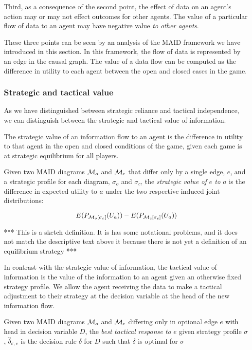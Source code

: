 \documentclass[../thesis.tex]{subfiles}
\begin{document}
Third, as a consequence of the second point,
the effect of data on an agent's action may or may
not effect outcomes for other agents.
The value of a particular flow of data to an agent
may have negative value \emph{to other agents}.

These three points can be seen by an analysis of the MAID
framework we have introduced in this section.
In this framework, the flow of data is represented by
an edge in the causal graph.
The value of a data flow can be computed as the difference
in utility to each agent between the open and closed cases
in the game.

\subsubsection{Strategic and tactical value}

As we have distinguished between strategic reliance and
tactical independence, we can distinguish between the
strategic and tactical value of information.

The strategic value of an information flow to an agent
is the difference in utility to that agent in the open
and closed conditions of the game, given each game
is at strategic equilibrium for all players.

\begin{dfn}
  \label{dfn:strategic-value}
  Given two MAID diagrams $\mathcal{M}_{o}$ and $\mathcal{M}_{c}$
  that differ only by a single edge, $e$,
  and a strategic profile for each diagram, $\sigma_{o}$
  and $\sigma_{c}$, the \emph{strategic value of $e$ to $a$}
  is the difference in expected utility to $a$ under the
  two respective induced joint distributions:

  $$E(P_{\mathcal{M}_{o}[\sigma_{o}]}(U_a)) - E(P_{\mathcal{M}_{c}[\sigma_{c}]}(U_a))$$
\end{dfn}

*** This is a sketch definition.
It is has some notational problems, and it does
not match the descriptive text above it because there
is not yet a definition of an equilibrium strategy ***

In contrast with the strategic value of information,
the tactical value of information is the value of
the information to an agent given an otherwise fixed
strategy profile.
We allow the agent receiving the data to make a tactical
adjustment to their strategy at the decision variable
at the head of the new information flow.

\begin{dfn}
  Given two MAID diagrams $\mathcal{M}_{o}$ and $\mathcal{M}_{c}$
  differing only in optional edge $e$ with head in decision
  variable $D$,
  the \emph{best tactical response to $e$} given
  strategy profile $\sigma$, $\hat{\delta}_{\sigma,e}$
  is the decision rule $\delta$ for $D$ such
  that $\delta$ is optimal for $\sigma$
\end{dfn}
\end{document}
